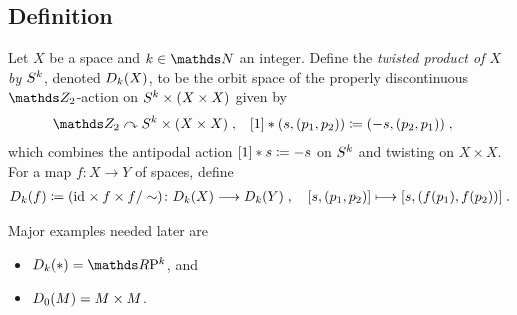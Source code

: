 \subsection{Definition}
\begin{Def}
  Let $X$ be a space and $k\in\Nat$ an integer.
  Define the \emph{twisted product of $X$ by $S^{k}$}, denoted
  $D_{k}({X})$, to be the orbit space of the properly
  discontinuous $\Zmod2$-action on $S^{k}\times(X\times X)$ given
  by
  \begin{align*}
    \Zmod2 &\leftgroupaction \Twistedprodcovspace{k}{X}
             \;,
    &[1] \actson (s, (p_1,p_2)) &\coloneqq (-s, (p_2, p_1))
                                  \;,
  \end{align*}
  which combines the antipodal action $[1]\ast s\coloneqq -s$ on
  $S^{k}$ and twisting on $X\times X$.
  For a map $f\colon X\to Y$ of spaces, define
  \begin{gather*}
    D_{k}({f})\coloneqq (\mathrm{id}_{}\times f\times f/\sim)\colon
    D_{k}({X})\longrightarrow D_{k}({Y})
    \;,\quad
    [s,(p_1,p_2)] \longmapsto [s,(f(p_1),f(p_2))]
    \;.
  \end{gather*}
\end{Def}
\begin{Ex}
  Major examples needed later are
  \begin{itemize}
  \item $\Twistedprod k {\pt} = \RP k$, and
  \item $D_{0}({M}) = M\times M$.
  \end{itemize}
\end{Ex}

